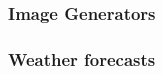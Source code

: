 \begin{frame}
    \frametitle{Image Generators}
    
    \begin{figure}
       \centering
    \end{figure}

\end{frame}


\begin{frame}
    \frametitle{Weather forecasts}
    
    \begin{figure}
       \centering
    \end{figure}

\end{frame}


